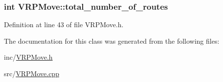 \hypertarget{class_v_r_p_move_a37f85cb82daea77577c4ed1583c758df}{
\subsubsection[{total\_\-number\_\-of\_\-routes}]{\setlength{\rightskip}{0pt plus 5cm}int {\bf VRPMove::total\_\-number\_\-of\_\-routes}}}
\label{class_v_r_p_move_a37f85cb82daea77577c4ed1583c758df}


Definition at line 43 of file VRPMove.h.



The documentation for this class was generated from the following files:\begin{DoxyCompactItemize}
\item 
inc/\hyperlink{_v_r_p_move_8h}{VRPMove.h}\item 
src/\hyperlink{_v_r_p_move_8cpp}{VRPMove.cpp}\end{DoxyCompactItemize}
